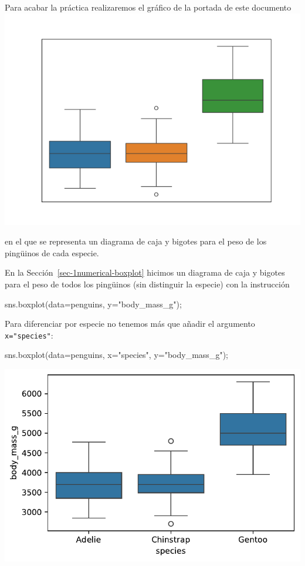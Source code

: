 \documentclass[
  a4paper,
  noprof,
  12pt,
  notoc,
  nosols,
  nobib]{mnye}
\newenvironment{Shaded}{\begin{snugshade}}{\end{snugshade}}
\newcommand{\NormalTok}[1]{\textcolor[rgb]{0.00,0.23,0.31}{#1}}
\newcommand{\OperatorTok}[1]{\textcolor[rgb]{0.37,0.37,0.37}{#1}}
\newcommand{\StringTok}[1]{\textcolor[rgb]{0.13,0.47,0.30}{#1}}
\theoremstyle{definition}
\theoremstyle{remark}
\begin{document}
Para acabar la práctica realizaremos el gráfico de la portada de este
documento \includegraphics{chapters/../img/cover/cover.png}

en el que se representa un diagrama de caja y bigotes para el peso de
los pingüinos de cada especie.

En la Sección~\ref{sec-1numerical-boxplot} hicimos un diagrama de caja y
bigotes para el peso de todos los pingüinos (sin distinguir la especie)
con la instrucción

\begin{Shaded}
\begin{Highlighting}[]
\NormalTok{sns.boxplot(data}\OperatorTok{=}\NormalTok{penguins, y}\OperatorTok{=}\StringTok{"body\_mass\_g"}\NormalTok{)}\OperatorTok{;}
\end{Highlighting}
\end{Shaded}

Para diferenciar por especie no tenemos más que añadir el argumento
\texttt{x="species"}:

\begin{Shaded}
\begin{Highlighting}[]
\NormalTok{sns.boxplot(data}\OperatorTok{=}\NormalTok{penguins, x}\OperatorTok{=}\StringTok{"species"}\NormalTok{, y}\OperatorTok{=}\StringTok{"body\_mass\_g"}\NormalTok{)}\OperatorTok{;}
\end{Highlighting}
\end{Shaded}

\includegraphics{chapters/numerical_by_categorical_files/figure-pdf/cell-12-output-1.pdf}
\end{document}
